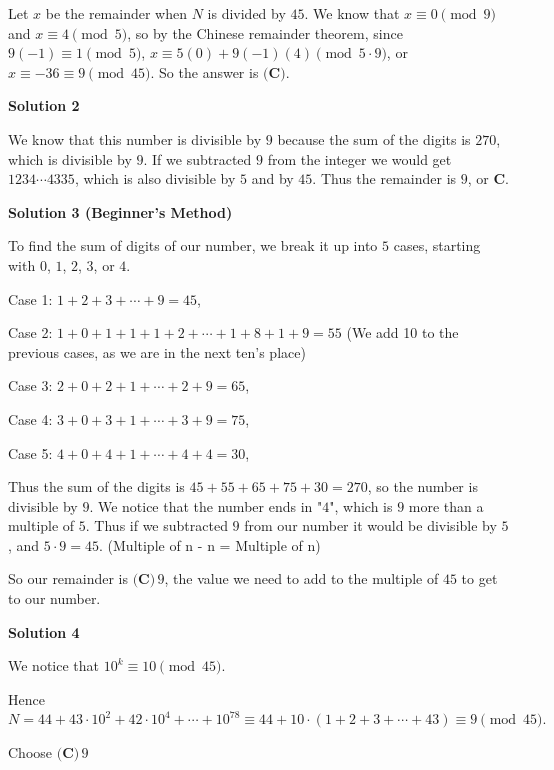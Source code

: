 \begin{enumerate}
 Let $x$ be the remainder when $N$ is divided by $45$. We know that $x\equiv 0 \pmod {9}$ and $x\equiv 4 \pmod {5}$, so by the Chinese remainder theorem, since $9(-1)\equiv 1 \pmod{5}$, $x\equiv 5(0)+9(-1)(4) \pmod {5\cdot 9}$, or $x\equiv -36 \equiv 9 \pmod {45}$. So the answer is $\boxed {\textbf {(C)}}$.

 



\textbf{Solution 2}

We know that this number is divisible by $9$ because the sum of the digits is $270$, which is divisible by $9$. If we subtracted $9$ from the integer we would get $1234 \cdots 4335$, which is also divisible by $5$ and by $45$. Thus the remainder is $9$, or $\boxed{\textbf{C}}$.

 



\textbf{Solution 3 (Beginner's Method)}

To find the sum of digits of our number, we break it up into $5$ cases, starting with $0$, $1$, $2$, $3$, or $4$.

 Case 1: $1+2+3+\cdots+9 = 45$,

 Case 2: $1+0+1+1+1+2+\cdots+1+8+1+9 = 55$ (We add 10 to the previous cases, as we are in the next ten's place)

 Case 3: $2+0+2+1+\cdots+2+9 = 65$,

 Case 4: $3+0+3+1+\cdots+3+9 = 75$,

 Case 5: $4+0+4+1+\cdots+4+4 = 30$,

 Thus the sum of the digits is $45+55+65+75+30 = 270$, so the number is divisible by $9$. We notice that the number ends in "$4$", which is $9$ more than a multiple of $5$. Thus if we subtracted $9$ from our number it would be divisible by $5$, and $5\cdot 9 = 45$. (Multiple of n - n = Multiple of n)

 
So our remainder is $\boxed{\textbf{(C)}\,9}$, the value we need to add to the multiple of $45$ to get to our number.

 



\textbf{Solution 4}

We notice that $10^{k}\equiv 10 \pmod {45}$.

 Hence $N = 44+43\cdot10^{2}+42\cdot10^{4}+\cdots+10^{78} \equiv 44+10\cdot(1+2+3+\cdots+43)\equiv 9 \pmod {45}.$

 Choose $\boxed{\textbf{(C)}\,9}$





\end{enumerate}
